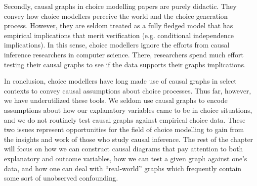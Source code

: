 Secondly, causal graphs in choice modelling papers are purely didactic.
They convey how choice modellers perceive the world and the choice generation process.
However, they are seldom treated as a fully fledged model that has empirical implications that merit verification (e.g. conditional independence implications).
In this sense, choice modellers ignore the efforts from causal inference researchers in computer science.
There, researchers spend much effort testing their causal graphs to see if the data supports their graphs implications.

In conclusion, choice modellers have long made use of causal graphs in select contexts to convey causal assumptions about choice processes.
Thus far, however, we have underutilized these tools.
We seldom use causal graphs to encode assumptions about how our explanatory variables came to be in choice situations, and we do not routinely test causal graphs against empirical choice data.
These two issues represent opportunities for the field of choice modelling to gain from the insights and work of those who study causal inference.
The rest of the chapter will focus on how we can construct causal diagrams that pay attention to both explanatory and outcome variables, how we can test a given graph against one's data, and how one can deal with ``real-world'' graphs which frequently contain some sort of unobserved confounding.
